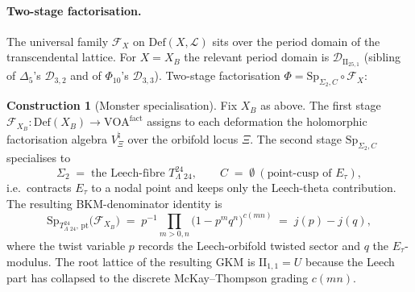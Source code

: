 \documentclass[11pt]{article}
\providecommand{\Leech}{\Lambda_{24}}
\providecommand{\IIlor}{\mathrm{II}_{25,1}}
\providecommand{\IIonel}{\mathrm{II}_{1,1}}
\providecommand{\Vnat}{V^{\natural}}
\providecommand{\Sp}{\mathrm{Sp}}
\providecommand{\Phii}{\Phi}
\providecommand{\Fcal}{\mathcal{F}}
\theoremstyle{plain}
\theoremstyle{definition}
\newtheorem{construction}[theorem]{Construction}
\begin{document}
\paragraph{Two-stage factorisation.} The universal family
$\Fcal_X$ on $\mathrm{Def}(X,\mathcal{L})$ sits over the period
domain of the transcendental lattice. For $X=X_B$ the relevant
period domain is
$\mathcal{D}_{\IIlor}$ (sibling of $\Delta_5$'s $\mathcal{D}_{3,2}$
and of $\Phi_{10}$'s $\mathcal{D}_{3,3}$). Two-stage factorisation
$\Phii = \Sp_{\Sigma_2,C}\circ\Fcal_X$:

\begin{construction}[Monster specialisation]
\label{cons:monster-specialisation}
Fix $X_B$ as above. The first stage
$\Fcal_{X_B}:\mathrm{Def}(X_B)\to\mathrm{VOA}^{\mathrm{fact}}$
assigns to each deformation the holomorphic factorisation algebra
$\Vnat_\Xi$ over the orbifold locus $\Xi$. The second stage
$\Sp_{\Sigma_2,C}$ specialises to
\[
  \Sigma_2 \;=\; \text{the Leech-fibre } T^{24}_\Leech,
  \qquad
  C \;=\; \emptyset \ (\text{point-cusp of } E_\tau),
\]
i.e.\ contracts $E_\tau$ to a nodal point and keeps only the
Leech-theta contribution. The resulting BKM-denominator identity is
\[
  \Sp_{T^{24}_\Leech,\,\mathrm{pt}}\!\bigl(\Fcal_{X_B}\bigr)
  \;=\; p^{-1}\prod_{m>0,n}\bigl(1-p^m q^n\bigr)^{c(mn)}
  \;=\; j(p)-j(q),
\]
where the twist variable $p$ records the Leech-orbifold twisted
sector and $q$ the $E_\tau$-modulus. The root lattice of the
resulting GKM is $\IIonel=U$ because the Leech part has collapsed
to the discrete McKay--Thompson grading $c(mn)$.
\end{construction}
\end{document}
